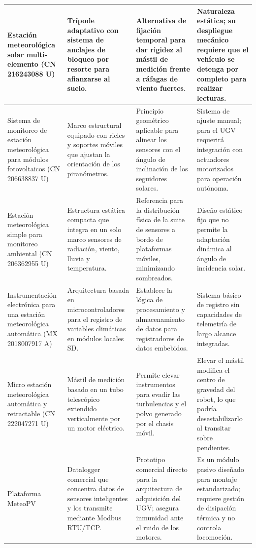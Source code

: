 \begin{center}
\begin{xltabular}{\textwidth}{|p{3.5cm}|>{\raggedright\arraybackslash}X|>{\raggedright\arraybackslash}X|>{\raggedright\arraybackslash}X|}
		Estación meteorológica solar multi-elemento (CN 216243088 U) & Trípode adaptativo con sistema de anclajes de bloqueo por resorte para afianzarse al suelo. & Alternativa de fijación temporal para dar rigidez al mástil de medición frente a ráfagas de viento fuertes. & Naturaleza estática; su despliegue mecánico requiere que el vehículo se detenga por completo para realizar lecturas. \\ \hline
		Sistema de monitoreo de estación meteorológica para módulos fotovoltaicos (CN 206638837 U) & Marco estructural equipado con rieles y soportes móviles que ajustan la orientación de los piranómetros. & Principio geométrico aplicable para alinear los sensores con el ángulo de inclinación de los seguidores solares. & Sistema de ajuste manual; para el UGV requerirá integración con actuadores motorizados para operación autónoma. \\ \hline
		Estación meteorológica simple para monitoreo ambiental (CN 206362955 U) & Estructura estática compacta que integra en un solo marco sensores de radiación, viento, lluvia y temperatura. & Referencia para la distribución física de la suite de sensores a bordo de plataformas móviles, minimizando sombreados. & Diseño estático fijo que no permite la adaptación dinámica al ángulo de incidencia solar. \\ \hline
		Instrumentación electrónica para una estación meteorológica automática (MX 2018007917 A) & Arquitectura basada en microcontroladores para el registro de variables climáticas en módulos locales SD. & Establece la lógica de procesamiento y almacenamiento de datos para registradores de datos embebidos. & Sistema básico de registro sin capacidades de telemetría de largo alcance integradas. \\ \hline
		Micro estación meteorológica automática y retractable (CN 222047271 U) & Mástil de medición basado en un tubo telescópico extendido verticalmente por un motor eléctrico. & Permite elevar instrumentos para evadir las turbulencias y el polvo generado por el chasis móvil. & Elevar el mástil modifica el centro de gravedad del robot, lo que podría desestabilizarlo al transitar sobre pendientes. \\ \hline
		Plataforma MeteoPV & Datalogger comercial que concentra datos de sensores inteligentes y los transmite mediante Modbus RTU/TCP. & Prototipo comercial directo para la arquitectura de adquisición del UGV; asegura inmunidad ante el ruido de los motores. & Es un módulo pasivo diseñado para montaje estandarizado; requiere gestión de disipación térmica y no controla locomoción. \\ \hline
		
	\end{xltabular}
\end{center}
